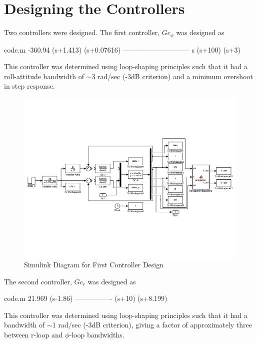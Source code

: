 \documentclass[12pt]{article}
\begin{document}
\section{Designing the Controllers}
Two controllers were designed. The first controller, $Gc_{\phi}$ was designed as
\begin{filecontents*}{code.m}
  -360.94 (s+1.413) (s+0.07616)
  -----------------------------
         s (s+100) (s+3)
\end{filecontents*}


\noindent This controller was determined using loop-shaping principles such that it had a roll-attitude bandwidth of $\sim$3 rad/sec (-3dB criterion) and a minimum overshoot in step response. \\

\begin{figure}[h!]
\begin{center}
\includegraphics[height=.425\textheight]{figures/first_controller_simulink}
\caption{Simulink Diagram for First Controller Design}
\end{center}
\end{figure}

\noindent The second controller, $Gc_r$ was designed as
\begin{filecontents*}{code.m}
  21.969 (s-1.86)
  ----------------
  (s+10) (s+8.199)
\end{filecontents*}


\noindent This controller was determined using loop-shaping principles such that it had a bandwidth of $\sim$1 rad/sec (-3dB criterion), giving a factor of approximately three between r-loop and $\phi$-loop bandwidths. \\
\end{document}
